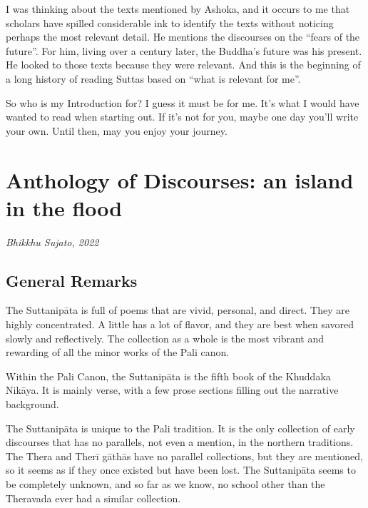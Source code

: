 \documentclass[12pt,openany]{book}%
\newcommand*{\scbyline}[1]{\begin{flushright}\textit{#1}\end{flushright}\bigskip}
\begin{document}
I was thinking about the texts mentioned by Ashoka, and it occurs to me that scholars have spilled considerable ink to identify the texts without noticing perhaps the most relevant detail. He mentions the discourses on the “fears of the future”. For him, living over a century later, the Buddha’s future was his present. He looked to those texts because they were relevant. And this is the beginning of a long history of reading Suttas based on “what is relevant for me”.

So who is my Introduction for? I guess it must be for me. It’s what I would have wanted to read when starting out. If it’s not for you, maybe one day you’ll write your own. Until then, may you enjoy your journey.

%
\chapter*{Anthology of Discourses: an island in the flood}

\scbyline{Bhikkhu Sujato, 2022}

\section*{General Remarks}

The \textsanskrit{Suttanipāta} is full of poems that are vivid, personal, and direct. They are highly concentrated. A little has a lot of flavor, and they are best when savored slowly and reflectively. The collection as a whole is the most vibrant and rewarding of all the minor works of the Pali canon.

Within the Pali Canon, the \textsanskrit{Suttanipāta} is the fifth book of the Khuddaka \textsanskrit{Nikāya}. It is mainly verse, with a few prose sections filling out the narrative background.

The \textsanskrit{Suttanipāta} is unique to the Pali tradition. It is the only collection of early discourses that has no parallels, not even a mention, in the northern traditions. The Thera and \textsanskrit{Therī} \textsanskrit{gāthās} have no parallel collections, but they are mentioned, so it seems as if they once existed but have been lost. The \textsanskrit{Suttanipāta} seems to be completely unknown, and so far as we know, no school other than the Theravada ever had a similar collection.
\end{document}
